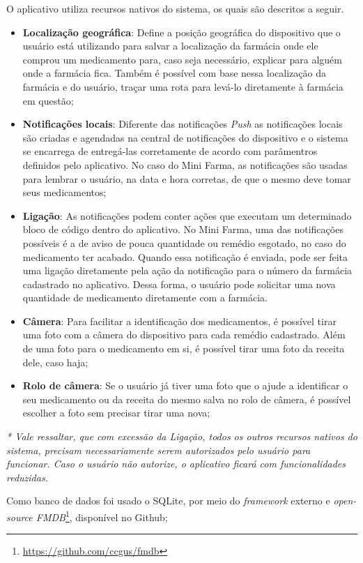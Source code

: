O aplicativo utiliza recursos nativos do sistema, os quais são descritos a seguir. 
\begin{itemize}
	\item \textbf{Localização geográfica}: Define a posição geográfica do dispositivo que o usuário está utilizando para salvar a 
    localização da farmácia onde ele comprou um medicamento para, caso seja necessário, explicar para alguém onde a 
    farmácia fica. Também é possível com base nessa localização da farmácia e do usuário, traçar uma rota para levá-lo diretamente à 
    farmácia em questão;
	\item \textbf{Notificações locais}: Diferente das notificações \textit{Push} as notificações locais são criadas e agendadas na central 
    de notificações do dispositivo e o sistema se encarrega de entregá-las corretamente de acordo com parâmentros definidos pelo aplicativo. 
    No caso do Mini Farma, as notificações são usadas para lembrar o usuário, na data e hora corretas, de que o mesmo deve tomar seus medicamentos;
	\item \textbf{Ligação}: As notificações podem conter ações que executam um determinado bloco de código dentro do aplicativo. No Mini Farma, 
    uma das notificações possíveis é a de aviso de pouca quantidade ou remédio esgotado, no caso do medicamento ter acabado. 
    Quando essa notificação é enviada, pode ser feita uma ligação diretamente pela ação da notificação para o número da 
    farmácia cadastrado no aplicativo. Dessa forma, o usuário pode solicitar uma nova quantidade de medicamento diretamente com a farmácia. 
	\item \textbf{Câmera}: Para facilitar a identificação dos medicamentos, é possível tirar uma foto com a câmera do dispositivo para 
    cada remédio cadastrado. Além de uma foto para o medicamento em si, é possível tirar uma foto da receita dele, caso haja;
    \item \textbf{Rolo de câmera}: Se o usuário já tiver uma foto que o ajude a identificar o seu medicamento ou da receita do mesmo salva 
    no rolo de câmera, é possível escolher a foto sem precisar tirar uma nova;
\end{itemize}

\textit{* Vale ressaltar, que com excessão da Ligação, todos os outros recursos nativos do sistema, precisam necessariamente serem autorizados pelo
usuário para funcionar. Caso o usuário não autorize, o aplicativo ficará com funcionalidades reduzidas.} 

Como banco de dados foi usado o SQLite, por meio do \textit{framework} externo e \textit{open-source FMDB}\footnote{\url{https://github.com/ccgus/fmdb}}, 
disponível no Github;

